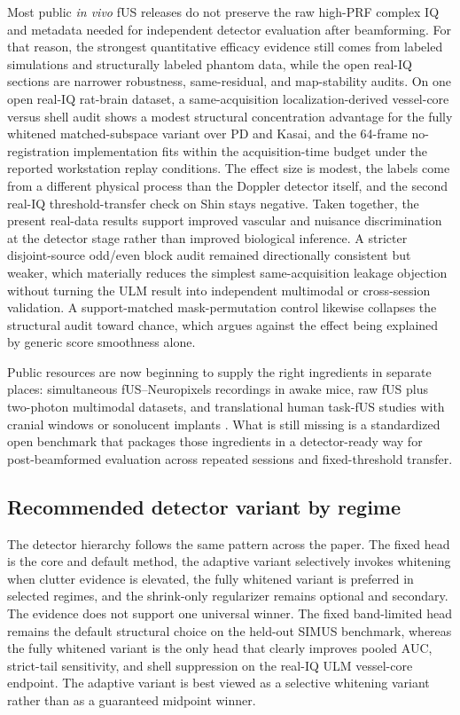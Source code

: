 \documentclass[11pt]{article}
\begin{document}
Most public \emph{in vivo} fUS releases do not preserve the raw high-PRF complex IQ and metadata needed for independent detector evaluation after beamforming. For that reason, the strongest quantitative efficacy evidence still comes from labeled simulations and structurally labeled phantom data, while the open real-IQ sections are narrower robustness, same-residual, and map-stability audits. On one open real-IQ rat-brain dataset, a same-acquisition localization-derived vessel-core versus shell audit shows a modest structural concentration advantage for the fully whitened matched-subspace variant over PD and Kasai, and the 64-frame no-registration implementation fits within the acquisition-time budget under the reported workstation replay conditions. The effect size is modest, the labels come from a different physical process than the Doppler detector itself, and the second real-IQ threshold-transfer check on Shin stays negative. Taken together, the present real-data results support improved vascular and nuisance discrimination at the detector stage rather than improved biological inference.
A stricter disjoint-source odd/even block audit remained directionally consistent but weaker, which materially reduces the simplest same-acquisition leakage objection without turning the ULM result into independent multimodal or cross-session validation. A support-matched mask-permutation control likewise collapses the structural audit toward chance, which argues against the effect being explained by generic score smoothness alone.

Public resources are now beginning to supply the right ingredients in separate places: simultaneous fUS--Neuropixels recordings in awake mice, raw fUS plus two-photon multimodal datasets, and translational human task-fUS studies with cranial windows or sonolucent implants \cite{LambertNeuropixels2025,COMBOWindow2024,ChenComa2025,Rabut2024,MobileFUS2025}. What is still missing is a standardized open benchmark that packages those ingredients in a detector-ready way for post-beamformed evaluation across repeated sessions and fixed-threshold transfer.

\subsection*{Recommended detector variant by regime}
The detector hierarchy follows the same pattern across the paper. The fixed head is the core and default method, the adaptive variant selectively invokes whitening when clutter evidence is elevated, the fully whitened variant is preferred in selected regimes, and the shrink-only regularizer remains optional and secondary. The evidence does not support one universal winner. The fixed band-limited head remains the default structural choice on the held-out SIMUS benchmark, whereas the fully whitened variant is the only head that clearly improves pooled AUC, strict-tail sensitivity, and shell suppression on the real-IQ ULM vessel-core endpoint. The adaptive variant is best viewed as a selective whitening variant rather than as a guaranteed midpoint winner.
\end{document}
